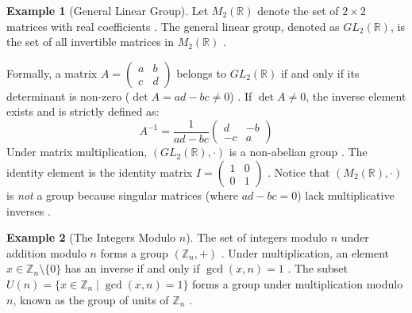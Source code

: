 \documentclass[11pt]{article}
\theoremstyle{definition}
\newtheorem{example}{Example}[section]
\theoremstyle{plain}
\theoremstyle{remark}
\begin{document}
\begin{example}[General Linear Group]
Let $M_2(\mathbb{R})$ denote the set of $2 \times 2$ matrices with real coefficients \cite{dummit}. The general linear group, denoted as $GL_2(\mathbb{R})$, is the set of all invertible matrices in $M_2(\mathbb{R})$ \cite{gallian}. 

Formally, a matrix $A = \left(\begin{smallmatrix} a & b \\ c & d \end{smallmatrix}\right)$ belongs to $GL_2(\mathbb{R})$ if and only if its determinant is non-zero ($\det A = ad - bc \neq 0$) \cite{dummit}. If $\det A \neq 0$, the inverse element exists and is strictly defined as:
\begin{equation}
    A^{-1} = \frac{1}{ad-bc} \begin{pmatrix} d & -b \\ -c & a \end{pmatrix}
\end{equation}
Under matrix multiplication, $(GL_2(\mathbb{R}), \cdot)$ is a non-abelian group \cite{fraleigh}. The identity element is the identity matrix $I = \left(\begin{smallmatrix} 1 & 0 \\ 0 & 1 \end{smallmatrix}\right)$ \cite{gallian}. Notice that $(M_2(\mathbb{R}), \cdot)$ is \emph{not} a group because singular matrices (where $ad - bc = 0$) lack multiplicative inverses \cite{dummit}.
\end{example}

\begin{example}[The Integers Modulo $n$]
The set of integers modulo $n$ under addition modulo $n$ forms a group $(\mathbb{Z}_n, +)$ \cite{fraleigh}. Under multiplication, an element $x \in \mathbb{Z}_n \setminus \{0\}$ has an inverse if and only if $\gcd(x, n) = 1$ \cite{gallian}. The subset $U(n) = \{x \in \mathbb{Z}_n \mid \gcd(x, n) = 1\}$ forms a group under multiplication modulo $n$, known as the group of units of $\mathbb{Z}_n$ \cite{dummit, gallian}.
\end{example}
\end{document}
